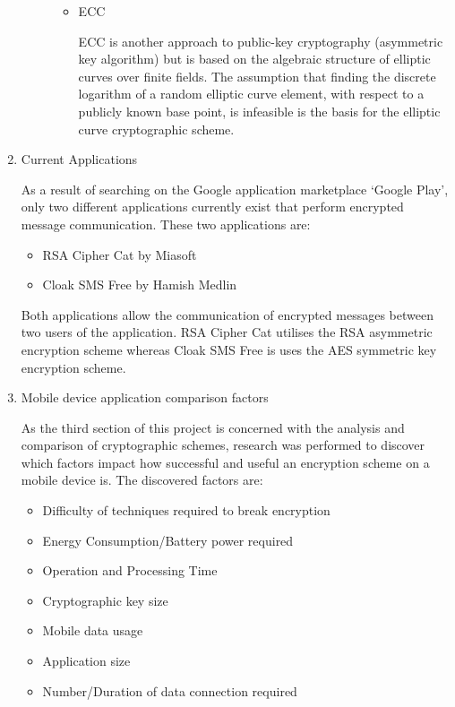 \documentclass[a4paper,11pt]{article}
\begin{document}
\begin{enumerate}
\begin{description}
\begin{itemize}
      \item
      \begin{description}
        \item[ECC] 
      \end{description}
      ECC is another approach to public-key cryptography (asymmetric key algorithm) but is based on the algebraic structure of elliptic curves over finite fields. The assumption that finding the discrete logarithm of a random elliptic curve element, with respect to a publicly known base point, is infeasible is the basis for the elliptic curve cryptographic scheme.
    \end{itemize}
  \end{description}
  \item
  \begin{description}
    \item[Current Applications] 
  \end{description}
  As a result of searching on the Google application marketplace ‘Google Play’, only two different applications currently exist that perform encrypted message communication. These two applications are:
  \begin{itemize}
    \item RSA Cipher Cat by Miasoft
    \item Cloak SMS Free by Hamish Medlin
  \end{itemize}
  Both applications allow the communication of encrypted messages between two users of the application. RSA Cipher Cat utilises the RSA asymmetric encryption scheme whereas Cloak SMS Free is uses the AES symmetric key encryption scheme.
  \item
  \begin{description}
    \item[Mobile device application comparison factors] 
  \end{description}
  As the third section of this project is concerned with the analysis and comparison of cryptographic schemes, research was performed to discover which factors impact how successful and useful an encryption scheme on a mobile device is. The discovered factors are:
  \begin{itemize}
    \item Difficulty of techniques required to break encryption
    \item Energy Consumption/Battery power required
    \item Operation and Processing Time
    \item Cryptographic key size
    \item Mobile data usage
    \item Application size
    \item Number/Duration of data connection required
  \end{itemize}
\end{enumerate}
\end{document}

